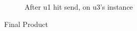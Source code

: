 \documentclass[11pt,a4paper]{article}
\begin{document}
\begin{figure}[h!]
\begin{subfigure}[b]{0.4\linewidth}
    		\caption{After u1 hit send, on u3's instance}
  		\end{subfigure}
  		\caption{Final Product}
  		\label{fig:chat}
	\end{figure}
	
\end{document}
